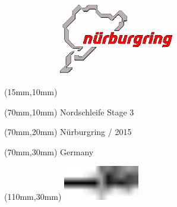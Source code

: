 \null\newpage
\begin{textblock*}{50mm}(15mm,10mm)%
\includegraphics[width=50mm]{LG/NUR.png}
\end{textblock*}
\begin{textblock*}{130mm}(70mm,10mm)%
{\fontsize{20}{20}\selectfont Nordschleife Stage 3}\\
\end{textblock*}
\begin{textblock*}{120mm}(70mm,20mm)%
{\fontsize{16}{16}\selectfont Nürburgring / 2015}\\
\end{textblock*}
\begin{textblock*}{120mm}(70mm,30mm)%
{\fontsize{12}{12}\selectfont Germany}
\end{textblock*}
\begin{textblock*}{30mm}(110mm,30mm)%
\centering
\includegraphics[height=15mm]{icons/tofinish.pdf}
\end{textblock*}
